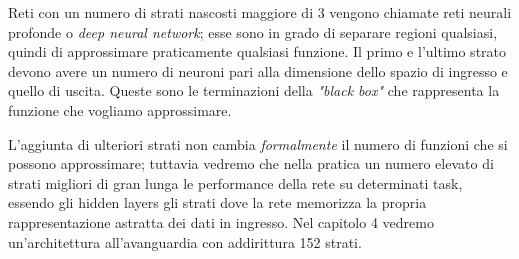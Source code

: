 Reti con un numero di strati nascosti maggiore di 3 vengono chiamate reti neurali profonde o \emph{deep neural network}; esse sono in grado di separare regioni qualsiasi, quindi di approssimare praticamente qualsiasi funzione. Il primo e l’ultimo strato devono avere un numero di neuroni pari alla dimensione dello spazio di ingresso e quello di uscita. Queste sono le terminazioni della \emph{"black box"} che rappresenta la funzione che vogliamo approssimare. 

L'aggiunta di ulteriori strati non cambia \emph{formalmente} il numero di funzioni che si possono approssimare; tuttavia vedremo che nella pratica un numero elevato di strati migliori di gran lunga le performance della rete su determinati task, essendo gli hidden layers gli strati dove la rete memorizza la propria rappresentazione astratta dei dati in ingresso. Nel capitolo 4 vedremo un'architettura all'avanguardia con addirittura 152 strati.
 


